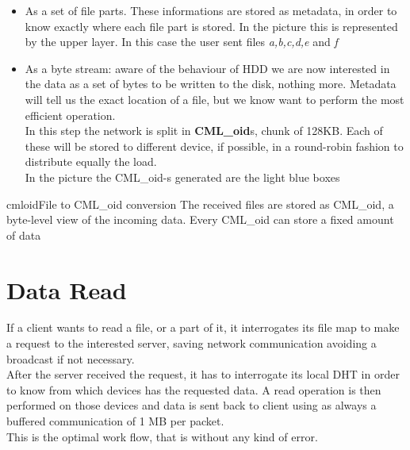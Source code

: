 \begin{itemize}
    \item As a set of file parts. These informations are stored as metadata, in
        order to know exactly where each file part is stored. In the picture
        this is represented by the upper layer. In this case the user sent files
        \textit{a,b,c,d,e} and \textit{f}
    \item As a byte stream: aware of the behaviour of HDD we are now interested
        in the data as a set of bytes to be written to the disk, nothing more.
        Metadata will tell us the exact location of a file, but we know want to
        perform the most efficient operation. \\
        In this step the network is split in \textbf{CML\_oid}s, chunk of 128KB.
        Each of these will be stored to different device, if possible, in a
        round-robin fashion to distribute equally the load. \\
        In the picture the CML\_oid-s generated are the light blue boxes
\end{itemize}

\begin{myimage}{cmloid}{File to CML\_oid conversion}
    The received files are stored as CML\_oid, a byte-level view of the incoming
    data. Every CML\_oid can store a fixed amount of data
\end{myimage}

\section{Data Read}
If a client wants to read a file, or a part of it, it interrogates its file map
to make a request to the interested server, saving network communication
avoiding a broadcast if not necessary. \\
After the server received the request, it has to interrogate its local DHT in
order to know from which devices has the requested data. A read operation is
then performed on those devices and data is sent back to client using as always
a buffered communication of 1 MB per packet. \\
This is the optimal work flow, that is without any kind of error.



